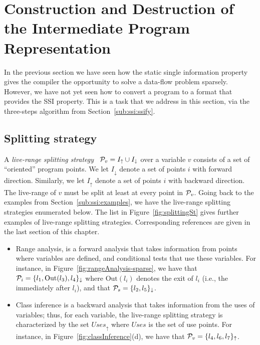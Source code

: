 {\section{Construction and Destruction of the Intermediate Program Representation}
\label{sec:building}
\def\Sdown{\downarrow}
\def\Sup{\uparrow}
\def\SS{{\cal P}}
\def\Out{\textrm{Out}}
\def\In{\textrm{In}}
\def\Defs{\textrm{Defs}}
\def\Def{\textrm{Def}}
\def\Uses{\textrm{Uses}}

In the previous section we have seen how the static single information
property gives the compiler the opportunity to solve a data-flow problem sparsely.
However, we have not yet seen how to convert a program to a format that provides the SSI property.
This is a task that we address in this section, via the three-steps algorithm from Section~\ref{sub:ssi:ssify}.

\subsection{Splitting strategy}
A {\em live-range splitting strategy} \
$\SS_v = I_\uparrow \cup I_\downarrow$ over a variable $v$ consists of a set
of ``oriented'' program points.
We let $I_\downarrow$ denote a set of points $i$ with forward direction.
Similarly, we let $I_\uparrow$ denote a set of points $i$ with backward
direction.
The live-range of $v$ must be split at least at every point in $\SS_v$.
Going back to the examples from Section~\ref{sub:ssi:examples}, we have the live-range splitting strategies enumerated below.
The list in Figure~\ref{fig:splittingSt} gives further examples of live-range splitting strategies. Corresponding references are given in the last section of this chapter.

\begin{itemize}
\item Range analysis, is a forward analysis that takes information from points where variables are defined, and conditional tests that use these variables.
For instance, in Figure~\ref{fig:rangeAnalysis-sparse}, we have that $\SS_{i} = \{l_1, \Out(l_3), l_4\}_\downarrow$ where $\Out(l_i)$ denotes the exit of $l_i$ (i.e., the \progpoint immediately after $l_i$), and that $\SS_{s}=\{l_2, l_5\}_\downarrow$.

\item Class inference is a backward analysis that takes information from the uses of variables; thus, for each variable, the live-range splitting strategy is characterized by the set $\textit{Uses}_\uparrow$ where $\textit{Uses}$ is the set of use points.
For instance, in Figure~\ref{fig:classInference}(d), we have that
$\SS_{v} = \{l_4, l_6,l_7\}_\uparrow$.



\end{itemize}}

